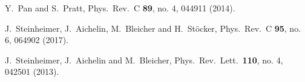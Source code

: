 \begin{thebibliography}{99}
  Y.~Pan and S.~Pratt,
  Phys.\ Rev.\ C {\bf 89}, no. 4, 044911 (2014).

  J.~Steinheimer, J.~Aichelin, M.~Bleicher and H.~Stöcker,
  Phys.\ Rev.\ C {\bf 95}, no. 6, 064902 (2017).
 
  J.~Steinheimer, J.~Aichelin and M.~Bleicher,
  Phys.\ Rev.\ Lett.\  {\bf 110}, no. 4, 042501 (2013).
  

\begin{comment}

  R.~Bellwied, S.~Borsanyi, Z.~Fodor, S.~D.~Katz, A.~Pasztor, C.~Ratti and K.~K.~Szabo,
  Phys.\ Rev.\ D {\bf 92}, no. 11, 114505 (2015).


  B.~Ling, T.~Springer and M.~Stephanov,
  Phys.\ Rev.\ C {\bf 89}, no. 6, 064901 (2014).

  P.~Bozek,
  Phys.\ Lett.\ B {\bf 609}, 247 (2005).


  S.~Cheng, S.~Petriconi, S.~Pratt, M.~Skoby, C.~Gale, S.~Jeon, V.~Topor Pop and Q.~H.~Zhang,
  Phys.\ Rev.\ C {\bf 69}, 054906 (2004).


\end{comment}
\end{thebibliography}
